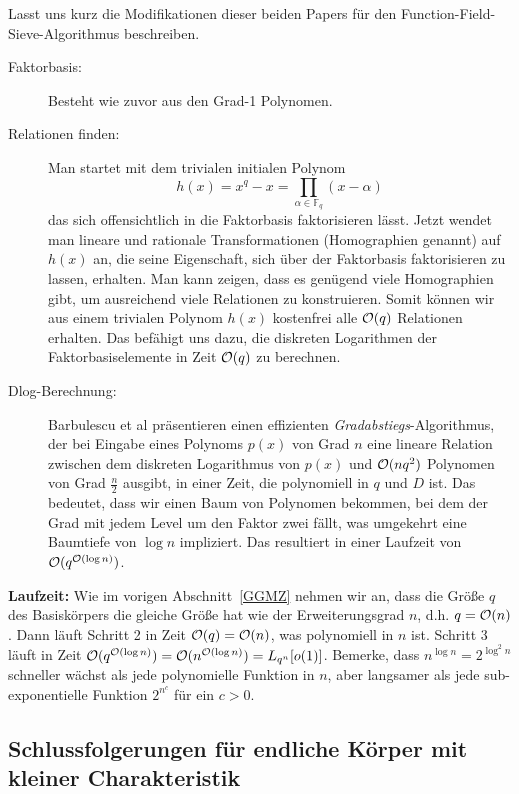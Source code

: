 \begin{refsegment}
Lasst uns kurz die Modifikationen dieser beiden Papers für den Function-Field-Sieve-Algo\-rith\-mus beschreiben.


\begin{description}
\item[Faktorbasis:] Besteht wie zuvor aus den Grad-1 Polynomen.
\item[Relationen finden:] Man startet mit dem trivialen initialen Polynom
$$
  h(x)= x^q-x = \prod_{\alpha \in \mathbb{F}_q} (x-\alpha)
$$
das sich offensichtlich in die Faktorbasis faktorisieren lässt. Jetzt wendet man lineare und rationale Transformationen (Homographien genannt) auf $h(x)$ an, die seine Eigenschaft, sich über der Faktorbasis faktorisieren zu lassen, erhalten. Man kann zeigen, dass es genügend viele Homographien gibt, um ausreichend viele Relationen zu konstruieren. Somit können wir aus einem trivialen Polynom $h(x)$ kostenfrei alle ${\cal O}(q)$ Relationen erhalten. Das befähigt uns dazu, die diskreten Logarithmen der Faktorbasiselemente in Zeit ${\cal O}(q)$ zu berechnen.
\item[Dlog-Berechnung:] Barbulescu et al präsentieren einen effizienten {\em Gradabstiegs}-Algorithmus, der bei Eingabe eines Polynoms $p(x)$ von Grad $n$ eine lineare Relation zwischen dem diskreten Logarithmus von $p(x)$ und ${\cal O}(nq^2)$ Polynomen von Grad $\frac n 2$ ausgibt, in einer Zeit, die polynomiell in $q$ und $D$ ist. Das bedeutet, dass wir einen Baum von Polynomen bekommen, bei dem der Grad mit jedem Level um den Faktor zwei fällt, was umgekehrt eine Baumtiefe von $\log n$ impliziert. Das resultiert in einer Laufzeit von ${\cal O}(q^{{\cal O}(\log n)})$.
\end{description}

\textbf{Laufzeit:}
Wie im vorigen Abschnitt~\ref{GGMZ} nehmen wir an, dass die Größe $q$ des Basiskörpers die gleiche Größe hat wie der Erweiterungsgrad $n$, d.h. $q={\cal O}(n)$. Dann läuft Schritt 2 in Zeit ${\cal O}(q)={\cal O}(n)$, was polynomiell in $n$ ist. Schritt 3 läuft in Zeit ${\cal O}(q^{{\cal O}(\log n)})={\cal O}(n^{{\cal O}(\log n)}) = L_{q^n}[o(1)]$. Bemerke, dass $n^{\log n}=2^{\log^2 n}$ schneller wächst als jede polynomielle Funktion in $n$, aber langsamer als jede sub-exponentielle Funktion $2^{n^{c}}$ für ein $c>0$.


\subsection{Schlussfolgerungen für endliche Körper mit kleiner Charakteristik}


\end{refsegment}
